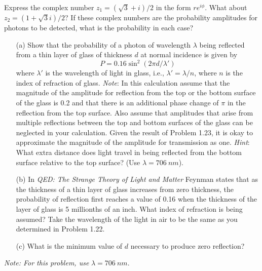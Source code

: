 \documentclass[12pt,letterpaper,boxed,cm]{hmcpset}
\newcommand{\s}[1]{\sqrt{#1}}
\newcommand{\pn}[1]{\left( #1 \right)}
\begin{document}

\begin{problem}[Townsend 1.19]
	 Express the complex number $z_1 = (\s{3} + i)/ 2$ in the form $re^{i\phi}$. What about $z_2 = (1 + \s{3}i)/2$? If these complex numbers are the probability amplitudes for photons to be detected, what is the probability in each case?
\end{problem}
\begin{solution}
\end{solution}
\newpage

\begin{problem}[Townsend 1.24]
	\begin{enumerate}
		\item[(a)] Show that the probability of a photon of wavelength $\lambda$ being reflected from a thin layer of glass of thickness $d$ at normal incidence is given by
		\[
			P = 0.16\sin^2\pn{2\pi d/\lambda'}
		\]
		where $\lambda'$ is the wavelength of light in glass, i.e., $\lambda' = \lambda/n$, where $n$ is the index of refraction of glass. \textit{Note}: In this calculation assume that the magnitude of the amplitude for reflection from the top or the bottom surface of the glass is 0.2 and that there is an additional phase change of $\pi$ in the reflection from the top surface. Also assume that amplitudes that arise from multiple reflections between the top and bottom surfaces of the glass can be neglected in your calculation. Given the result of Problem 1.23, it is okay to approximate the magnitude of the amplitude for transmission as one. \textit{Hint}: What extra distance does light travel in being reflected from the bottom surface relative to the top surface? (Use $\lambda = \SI{706}{nm}$).
		\item[(b)] In \textit{QED: The Strange Theory of Light and Matter} Feynman states that as the thickness of a thin layer of glass increases from zero thickness, the probability of reflection first reaches a value of 0.16 when the thickness of the layer of glass is 5 millionths of an inch. What index of refraction is being assumed? Take the wavelength of the light in air to be the same as you determined in Problem 1.22. 
		\item[(c)] What is the minimum value of $d$ necessary to produce zero reflection?
	\end{enumerate}
	\textit{Note: For this problem, use} $\lambda = \SI{706}{nm}$.
\end{problem}
\begin{solution}
\end{solution}
\newpage
\end{document}
